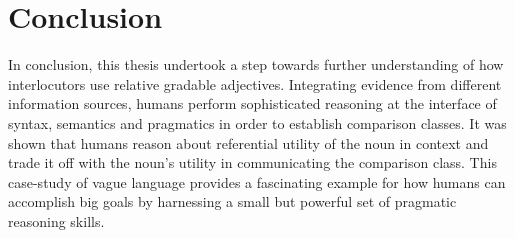 
\section{Conclusion}

In conclusion, this thesis undertook a step towards further understanding of how interlocutors use relative gradable adjectives. Integrating evidence from different information sources, humans perform sophisticated reasoning at the interface of syntax, semantics and pragmatics in order to establish comparison classes. It was shown that humans reason about referential utility of the noun in context and trade it off with the noun's utility in communicating the comparison class. This case-study of vague language provides a fascinating example for how humans can accomplish big goals by harnessing a small but powerful set of pragmatic reasoning skills. 
